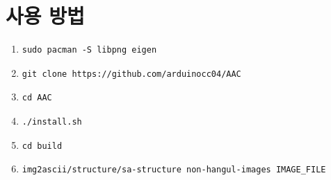 \documentclass[conference]{IEEEtran}
\begin{document}
\section{사용 방법}
\begin{enumerate}
\item \begin{verbatim}sudo pacman -S libpng eigen\end{verbatim}
\item \begin{verbatim}git clone https://github.com/arduinocc04/AAC\end{verbatim}
\item \begin{verbatim}cd AAC\end{verbatim}
\item \begin{verbatim}./install.sh\end{verbatim}
\item \begin{verbatim}cd build \end{verbatim}
\item \begin{verbatim}img2ascii/structure/sa-structure non-hangul-images IMAGE_FILE\end{verbatim}
\end{enumerate}


\begin{thebibliography}{00}
\bibitem{}
\end{thebibliography}
\end{document}
